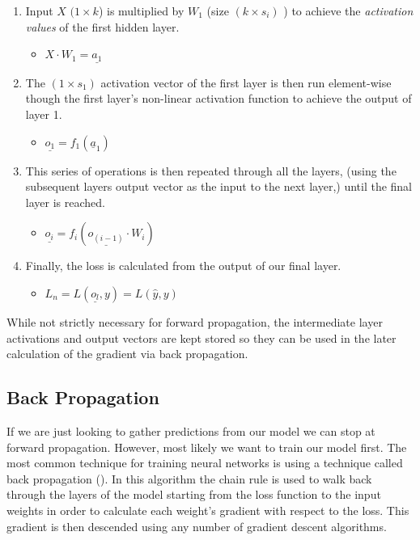 \documentclass[]{book}
\providecommand{\tightlist}{%
  \setlength{\itemsep}{0pt}\setlength{\parskip}{0pt}}
\theoremstyle{definition}
\theoremstyle{definition}
\theoremstyle{definition}
\theoremstyle{remark}
\begin{document}
\begin{enumerate}
\def\labelenumi{\arabic{enumi}.}
\tightlist
\item
  Input \(X\) \((1 \times k\)) is multiplied by \(W_1\) (size
  \((k\times s_i)\) ) to achieve the \emph{activation values} of the
  first hidden layer.

  \begin{itemize}
  \tightlist
  \item
    \(X \cdot W_1 = \underline{a_1}\)
  \end{itemize}
\item
  The \((1 \times s_1)\) activation vector of the first layer is then
  run element-wise though the first layer's non-linear activation
  function to achieve the output of layer 1.

  \begin{itemize}
  \tightlist
  \item
    \(\underline{o_1} = f_1(\underline{a}_1)\)
  \end{itemize}
\item
  This series of operations is then repeated through all the layers,
  (using the subsequent layers output vector as the input to the next
  layer,) until the final layer is reached.

  \begin{itemize}
  \tightlist
  \item
    \(\underline{o_i} = f_i(\underline{o_{(i - 1)}} \cdot W_i)\)
  \end{itemize}
\item
  Finally, the loss is calculated from the output of our final layer.

  \begin{itemize}
  \tightlist
  \item
    \(L_n = L(\underline{o_l}, y) = L(\hat{y}, y)\)
  \end{itemize}
\end{enumerate}

While not strictly necessary for forward propagation, the intermediate
layer activations and output vectors are kept stored so they can be used
in the later calculation of the gradient via back propagation.

\subsection{Back Propagation}\label{back-propagation}

If we are just looking to gather predictions from our model we can stop
at forward propagation. However, most likely we want to train our model
first. The most common technique for training neural networks is using a
technique called back propagation (\citet{backprop_1986}). In this
algorithm the chain rule is used to walk back through the layers of the
model starting from the loss function to the input weights in order to
calculate each weight's gradient with respect to the loss. This gradient
is then descended using any number of gradient descent algorithms.
\end{document}
